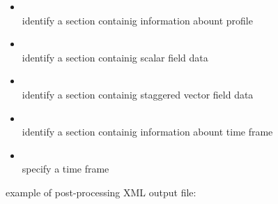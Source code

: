 \begin{itemize}
\item {} \\
      identify a section containig information abount profile

\item {} \\
      identify a section containig scalar field data

\item {} \\
      identify a section containig staggered vector field data

\item {} \\
      identify a section containig information abount time frame

\item {} \\
      specify a time frame
       

\end{itemize}


example of post-processing XML output file:

